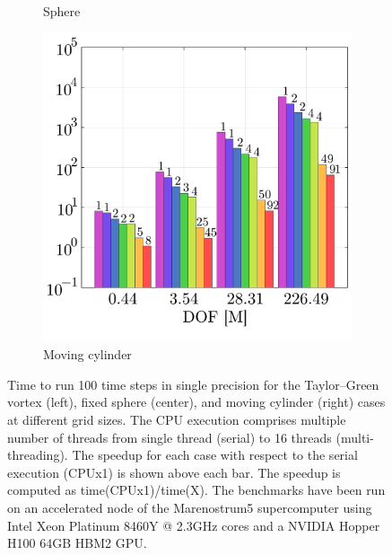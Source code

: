 \documentclass[final,3p,times]{elsarticle}
\begin{document}
\begin{figure}[!ht]
\begin{subfigure}[t]{0.33\linewidth}
    \caption{Sphere}
  \end{subfigure}
  \begin{subfigure}[t]{0.33\linewidth}
    \centering\hspace*{-0.2cm}
    \includegraphics[width=\linewidth]{img/cylinder_benchmark.pdf}
    \caption{Moving cylinder}
  \end{subfigure}
	\caption{Time to run 100 time steps in single precision for the Taylor--Green vortex (left), fixed sphere (center), and moving cylinder (right) cases at different grid sizes. The CPU execution comprises multiple number of threads from single thread (serial) to 16 threads (multi-threading). The speedup for each case with respect to the serial execution (CPUx1) is shown above each bar. The speedup is computed as time(CPUx1)/time(X). The benchmarks have been run on an accelerated node of the Marenostrum5 supercomputer using Intel Xeon Platinum 8460Y @ 2.3GHz cores and a NVIDIA Hopper H100 64GB HBM2 GPU.}
	\label{fig:benchmarks}
\end{figure}
\end{document}
